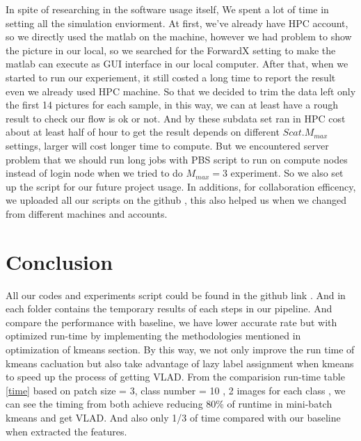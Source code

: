 \documentclass[final,leqno,onefignum,onetabnum]{siamltexmm}
\begin{document}
In spite of researching in the software usage itself, We spent a lot of time in setting all the simulation enviorment. At first, we've already have HPC account, so we directly used the matlab on the machine, however we had problem to show the picture in our local, so we searched for the ForwardX setting to make the matlab can execute as GUI interface in our local computer. After that, when we started to run our experiement, it still costed a long time to report the result even we already used HPC machine. So that we decided to trim the data left only the first 14 pictures for each sample, in this way, we can at least have a rough result to check our flow is ok or not. And by these subdata set ran in HPC cost about at least half of hour to get the result depends on different $Scat. M_{max}$ settings, larger will cost longer time to compute. But we encountered server problem that we should run long jobs with PBS script to run on compute nodes instead of login node when we tried to do $M_{max} = 3$ experiment. So we also set up the script for our future project usage.
In additions, for collaboration efficency, we uploaded all our scripts on the github \cite{github}, this also helped us when we changed from different machines and accounts. 








\section{Conclusion} 
All our codes and experiments script could be found in the github link \cite{github_final}. And in each folder contains the temporary results of each steps in our pipeline. And compare the performance with baseline, we have lower accurate rate but with optimized run-time by implementing the methodologies mentioned in optimization of kmeans section. By this way, we not only improve the run time of kmeans cacluation but also take advantage of lazy label assignment when kmeans to speed up the process of getting VLAD. From the comparision run-time table \ref{time} based on  patch size = 3, class number = 10 , 2 images for each class , we can see the timing from both achieve reducing 80\% of runtime in mini-batch kmeans and get VLAD. And also only 1/3 of time compared with our baseline when extracted the features.
\end{document}
